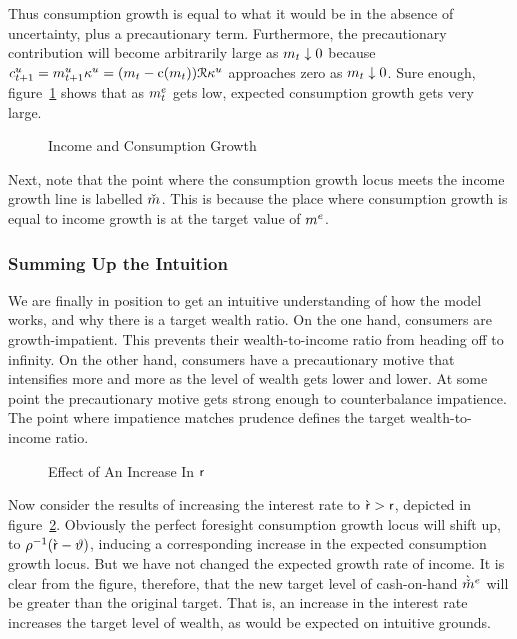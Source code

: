 \documentclass{handout}
\begin{document}
Thus consumption growth is equal to what it would be in the absence of
uncertainty, plus a precautionary term.  Furthermore, 
the precautionary contribution will become arbitrarily large as $m_{t}
\downarrow 0$ because $c^{u}_{t+1} = {m}^{u}_{t+1}\kappa^{u}  =
(m_{t}-\mathrm{c}(m_{t}))\mathcal{R}\kappa^{u}$ approaches zero as $m_{t} \downarrow 0$.  Sure
enough, figure~\ref{fig:GrowthA} shows that as $m^{e}_{t}$
gets low, expected consumption growth gets very large.


\begin{figure}
\caption{Income and Consumption Growth}\label{fig:GrowthA}
\end{figure}

Next, note that the point where the consumption growth locus
meets the income growth line is labelled $\mTarg^{\null}$.  This is
because the place where consumption growth is equal to income
growth is at the target value of $m^{e}$.



\subsubsection{Summing Up the Intuition}
We are finally in position to get an intuitive understanding of how the
model works, and why there is a target wealth ratio.  On the one hand,
consumers are growth-impatient.  This prevents their wealth-to-income ratio
from heading off to infinity.  On the other hand, consumers have
a precautionary motive that intensifies more and more as the level of
wealth gets lower and lower.  At some point the precautionary motive
gets strong enough to counterbalance impatience.  The point where impatience matches prudence defines the
target wealth-to-income ratio.


\begin{figure}
\caption{Effect of An Increase In $\mathsf{r}$}
\label{fig:GrowthB}
\end{figure}

Now consider the results of increasing the interest rate to
$\grave{\mathsf{r}}>\mathsf{r}$, depicted in figure~\ref{fig:GrowthB}.  Obviously the perfect foresight consumption
growth locus will shift up, to $\rho^{-1}(\grave{\mathsf{r}}-\vartheta)$,
inducing a corresponding increase in the expected consumption growth
locus.  But we have not changed the expected growth rate of income.
It is clear from the figure, therefore, that the new target level of
cash-on-hand $\grave{\check{m}}^{e}$ will be greater than the original target.
That is, an increase in the interest rate increases the target level
of wealth, as would be expected on intuitive grounds.
\end{document}
